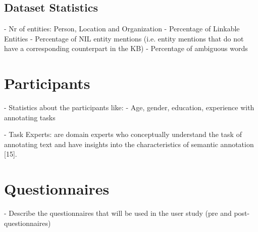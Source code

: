 \subsection{Dataset Statistics}
    - Nr of entities: Person, Location and Organization
    - Percentage of Linkable Entities
    - Percentage of NIL entity mentions (i.e. entity mentions that do not have a corresponding counterpart in the KB)
    - Percentage of ambiguous words
    
\section{Participants}
    - Statistics about the participants like:
        - Age, gender, education, experience with annotating tasks

- Task Experts: are domain experts who conceptually understand the task of annotating text and have insights into the characteristics of semantic annotation [15].
\section{Questionnaires}
    - Describe the questionnaires that will be used in the user study (pre and post-questionnaires)